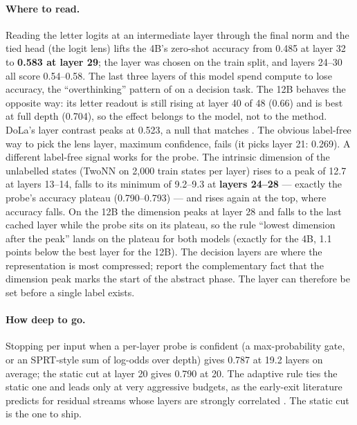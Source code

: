 \documentclass[11pt,a4paper]{article}
\begin{document}
\paragraph{Where to read.} Reading the letter logits at an intermediate layer through the final norm and the tied head (the logit lens) lifts the 4B's zero-shot accuracy from 0.485 at layer 32 to \textbf{0.583 at layer 29}; the layer was chosen on the train split, and layers 24--30 all score 0.54--0.58. The last three layers of this model spend compute to lose accuracy, the ``overthinking'' pattern of \cite{halawi} on a decision task. The 12B behaves the opposite way: its letter readout is still rising at layer 40 of 48 (0.66) and is best at full depth (0.704), so the effect belongs to the model, not to the method. DoLa's layer contrast \cite{dola} peaks at 0.523, a null that matches \cite{kappa}. The obvious label-free way to pick the lens layer, maximum confidence, fails (it picks layer 21: 0.269). A different label-free signal works for the probe. The intrinsic dimension of the unlabelled states (TwoNN \cite{twonn} on 2,000 train states per layer) rises to a peak of 12.7 at layers 13--14, falls to its minimum of 9.2--9.3 at \textbf{layers 24--28} --- exactly the probe's accuracy plateau (0.790--0.793) --- and rises again at the top, where accuracy falls. On the 12B the dimension peaks at layer 28 and falls to the last cached layer while the probe sits on its plateau, so the rule ``lowest dimension after the peak'' lands on the plateau for both models (exactly for the 4B, 1.1 points below the best layer for the 12B). The decision layers are where the representation is most compressed; \cite{cheng} report the complementary fact that the dimension peak marks the start of the abstract phase. The layer can therefore be set before a single label exists.

\paragraph{How deep to go.} Stopping per input when a per-layer probe is confident (a max-probability gate, or an SPRT-style sum of log-odds over depth) gives 0.787 at 19.2 layers on average; the static cut at layer 20 gives 0.790 at 20. The adaptive rule ties the static one and leads only at very aggressive budgets, as the early-exit literature predicts for residual streams whose layers are strongly correlated \cite{schwartz,jazbec}. The static cut is the one to ship.
\end{document}
